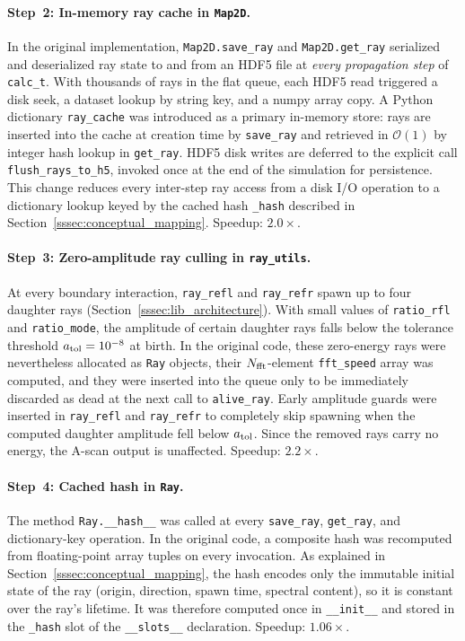             \paragraph*{Step~2: In-memory ray cache in \texttt{Map2D}.}
            In the original implementation, \texttt{Map2D.save\_ray} and \texttt{Map2D.get\_ray} serialized and deserialized ray state to and from an HDF5 file at \emph{every propagation step} of \texttt{calc\_t}. With thousands of rays in the flat queue, each HDF5 read triggered a disk seek, a dataset lookup by string key, and a numpy array copy. A Python dictionary \texttt{ray\_cache} was introduced as a primary in-memory store: rays are inserted into the cache at creation time by \texttt{save\_ray} and retrieved in $\mathcal{O}(1)$ by integer hash lookup in \texttt{get\_ray}. HDF5 disk writes are deferred to the explicit call \texttt{flush\_rays\_to\_h5}, invoked once at the end of the simulation for persistence.  This change reduces every inter-step ray access from a disk I/O operation to a dictionary lookup keyed by the cached hash \texttt{\_hash} described in Section~\ref{sssec:conceptual_mapping}. Speedup: $2.0\times$.

            \paragraph*{Step~3: Zero-amplitude ray culling in \texttt{ray\_utils}.}
            At every boundary interaction, \texttt{ray\_refl} and \texttt{ray\_refr} spawn up to four daughter rays (Section~\ref{sssec:lib_architecture}). With small values of \texttt{ratio\_rfl} and \texttt{ratio\_mode}, the amplitude of certain daughter rays falls below the tolerance threshold $a_{\rm tol} = 10^{-8}$ at birth.  In the original code, these zero-energy rays were nevertheless allocated as \texttt{Ray} objects, their $N_{\rm fft}$-element \texttt{fft\_speed} array was computed, and they were inserted into the queue only to be immediately discarded as dead at the next call to \texttt{alive\_ray}.  Early amplitude guards were inserted in \texttt{ray\_refl} and \texttt{ray\_refr} to completely skip spawning when the computed daughter amplitude fell below $a_{\rm tol}$. Since the removed rays carry no energy, the A-scan output is unaffected. Speedup: $2.2\times$.

            \paragraph*{Step~4: Cached hash in \texttt{Ray}.}
            The method \texttt{Ray.\_\_hash\_\_} was called at every \texttt{save\_ray}, \texttt{get\_ray}, and dictionary-key operation. In the original code, a composite hash was recomputed from floating-point array tuples on every invocation. As explained in Section~\ref{sssec:conceptual_mapping}, the hash encodes only the immutable initial state of the ray (origin, direction, spawn time, spectral content), so it is constant over the ray's lifetime. It was therefore computed once in \texttt{\_\_init\_\_} and stored in the \texttt{\_hash} slot of the \texttt{\_\_slots\_\_} declaration. Speedup: $1.06\times$.

